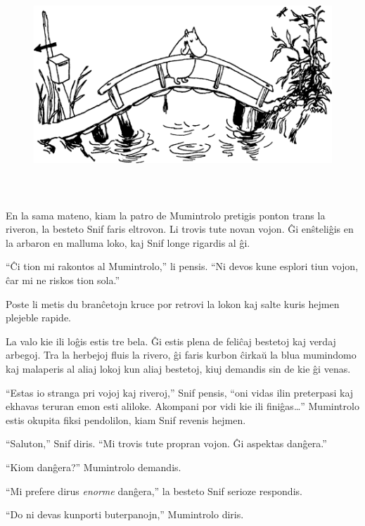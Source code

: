 \begin{figure}[htbp]
\centering
\includegraphics[width=450pt,height=237pt]{1-1.png}
\caption{}
\label{1-1}
\end{figure}

\noindent En la sama mateno, kiam la patro de Mumintrolo pretigis ponton trans la riveron, la besteto Snif faris eltrovon. Li trovis tute novan vojon. Ĝi enŝteliĝis en la arbaron en malluma loko, kaj Snif longe rigardis al ĝi.

``Ĉi tion mi rakontos al Mumintrolo,'' li pensis. ``Ni devos kune esplori tiun vojon, ĉar mi ne riskos tion sola.''

Poste li metis du branĉetojn kruce por retrovi la lokon kaj salte kuris hejmen plejeble rapide.

La valo kie ili loĝis estis tre bela. Ĝi estis plena de feliĉaj bestetoj kaj verdaj arbegoj. Tra la herbejoj fluis la rivero, ĝi faris kurbon ĉirkaŭ la blua mumindomo kaj malaperis al aliaj lokoj kun aliaj bestetoj, kiuj demandis sin de kie ĝi venas.

``Estas io stranga pri vojoj kaj riveroj,'' Snif pensis, ``oni vidas ilin preterpasi kaj ekhavas teruran emon esti aliloke. Akompani por vidi kie ili finiĝas{\ldots}''
\sectionbreak
Mumintrolo estis okupita fiksi pendolilon, kiam Snif revenis hejmen.

``Saluton,'' Snif diris. ``Mi trovis tute propran vojon. Ĝi aspektas danĝera.''

``Kiom danĝera?'' Mumintrolo demandis.

``Mi prefere dirus \emph{enorme} danĝera,'' la besteto Snif serioze respondis.

``Do ni devas kunporti buterpanojn,'' Mumintrolo diris.

